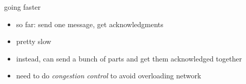 \begin{frame}{going faster}
    \begin{itemize}
    \item so far: send one message, get acknowledgments
    \vspace{.5cm}
    \item pretty slow
    \item instead, can send a bunch of parts and get them acknowledged together
    \item need to do \textit{congestion control} to avoid overloading network
    \end{itemize}
\end{frame}
